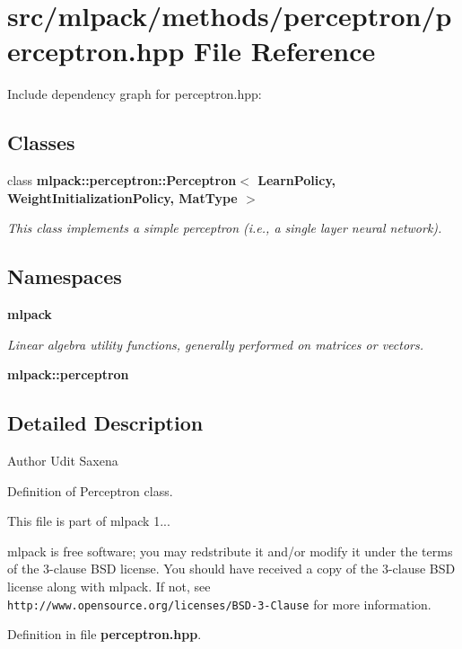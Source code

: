 \section{src/mlpack/methods/perceptron/perceptron.hpp File Reference}
\label{perceptron_8hpp}
Include dependency graph for perceptron.\-hpp\-:
\subsection*{Classes}
\begin{DoxyCompactItemize}
\item 
class {\bf mlpack\-::perceptron\-::\-Perceptron$<$ Learn\-Policy, Weight\-Initialization\-Policy, Mat\-Type $>$}
\begin{DoxyCompactList}\small\item\em This class implements a simple perceptron (i.\-e., a single layer neural network). \end{DoxyCompactList}\end{DoxyCompactItemize}
\subsection*{Namespaces}
\begin{DoxyCompactItemize}
\item 
{\bf mlpack}
\begin{DoxyCompactList}\small\item\em Linear algebra utility functions, generally performed on matrices or vectors. \end{DoxyCompactList}\item 
{\bf mlpack\-::perceptron}
\end{DoxyCompactItemize}


\subsection{Detailed Description}
\begin{DoxyAuthor}{Author}
Udit Saxena
\end{DoxyAuthor}
Definition of Perceptron class.

This file is part of mlpack 1...

mlpack is free software; you may redstribute it and/or modify it under the terms of the 3-\/clause B\-S\-D license. You should have received a copy of the 3-\/clause B\-S\-D license along with mlpack. If not, see {\tt http\-://www.\-opensource.\-org/licenses/\-B\-S\-D-\/3-\/\-Clause} for more information. 

Definition in file {\bf perceptron.\-hpp}.

